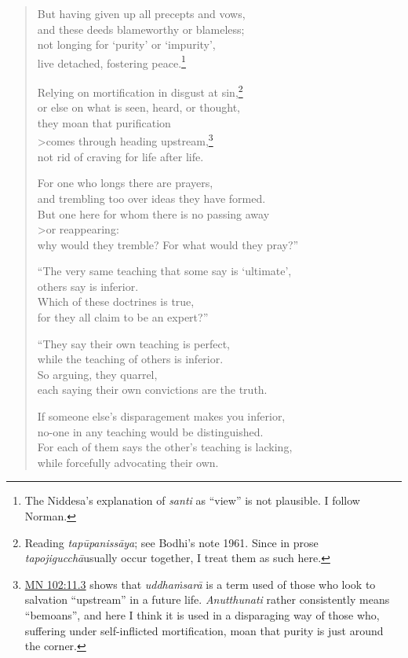 \documentclass[12pt,openany]{book}%
\begin{document}
\begin{verse}
But having given up all precepts and vows, \\
and these deeds blameworthy or blameless; \\
not longing for ‘purity’ or ‘impurity’, \\
live detached, fostering peace.\footnote{The Niddesa’s explanation of \textit{santi} as “view” is not plausible. I follow Norman. } 

Relying on mortification in disgust at sin,\footnote{Reading \textit{\textsanskrit{tapūpanissāya}}; see Bodhi’s note 1961. Since in prose \textit{\textsanskrit{tapojigucchā}}usually occur together, I treat them as such here. } \\
or else on what is seen, heard, or thought, \\
they moan that purification \\>comes through heading upstream,\footnote{\href{https://suttacentral.net/mn102/en/sujato\#11.3}{MN 102:11.3} shows that \textit{\textsanskrit{uddhaṁsarā}} is a term used of those who look to salvation “upstream” in a future life. \textit{Anutthunati} rather consistently means “bemoans”, and here I think it is used in a disparaging way of those who, suffering under self-inflicted mortification, moan that purity is just around the corner. } \\
not rid of craving for life after life. 

For one who longs there are prayers, \\
and trembling too over ideas they have formed. \\
But one here for whom there is no passing away \\>or reappearing: \\
why would they tremble? For what would they pray?” 

“The very same teaching that some say is ‘ultimate’, \\
others say is inferior. \\
Which of these doctrines is true, \\
for they all claim to be an expert?” 

“They say their own teaching is perfect, \\
while the teaching of others is inferior. \\
So arguing, they quarrel, \\
each saying their own convictions are the truth. 

If someone else’s disparagement makes you inferior, \\
no-one in any teaching would be distinguished. \\
For each of them says the other’s teaching is lacking, \\
while forcefully advocating their own. 


\end{verse}
\end{document}
